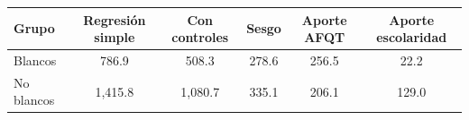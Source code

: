 
\begin{tabular}{lccccc}
\toprule
Grupo & Regresi\'on simple & Con controles & Sesgo & Aporte AFQT & Aporte escolaridad\\
\midrule
Blancos & 786.9 & 508.3 & 278.6 & 256.5 & 22.2\\
No blancos & 1,415.8 & 1,080.7 & 335.1 & 206.1 & 129.0\\
\bottomrule
\end{tabular}
